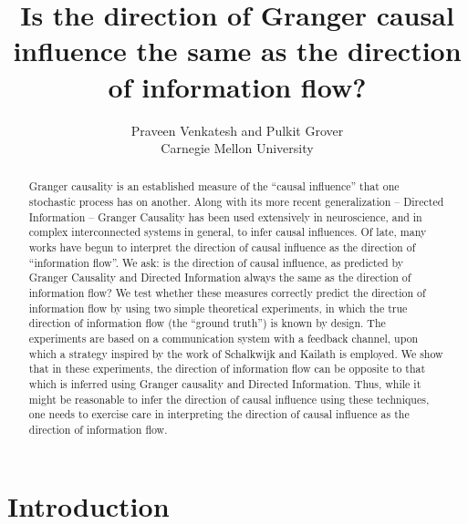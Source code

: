 \documentclass[letterpaper, 10pt, conference]{ieeeconf}
\begin{document}
\title{Is the direction of Granger causal influence the same as the direction of information flow?}
\author{Praveen Venkatesh and Pulkit Grover\\Carnegie Mellon University}

\maketitle


\begin{abstract}
	Granger causality is an established measure of the ``causal influence'' that one stochastic process has on another. Along with its more recent generalization -- Directed Information -- Granger Causality has been used extensively in neuroscience, and in complex interconnected systems in general, to infer causal influences. Of late, many works have begun to interpret the direction of causal influence as the direction of ``information flow''. We ask: is the direction of causal influence, as predicted by Granger Causality and Directed Information always the same as the direction of information flow? We test whether these measures correctly predict the direction of information flow by using two simple theoretical experiments, in which the true direction of information flow (the ``ground truth'') is known by design. The experiments are based on a communication system with a feedback channel, upon which a strategy inspired by the work of Schalkwijk and Kailath is employed. We show that in these experiments, the direction of information flow can be opposite to that which is inferred using Granger causality and Directed Information. Thus, while it might be reasonable to infer the direction of causal influence using these techniques, one needs to exercise care in interpreting the direction of causal influence as the direction of information flow.
\end{abstract}

\IEEEpeerreviewmaketitle


\section{Introduction}
\label{sec:intro}

\end{document}
